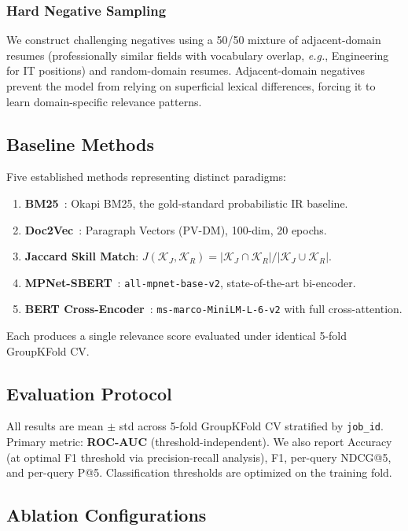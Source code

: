 \documentclass{llncs}
\begin{document}
\subsubsection{Hard Negative Sampling}
We construct challenging negatives using a 50/50 mixture of adjacent-domain resumes (professionally similar fields with vocabulary overlap, \textit{e.g.}, Engineering for IT positions) and random-domain resumes. Adjacent-domain negatives prevent the model from relying on superficial lexical differences, forcing it to learn domain-specific relevance patterns.

\subsection{Baseline Methods}

Five established methods representing distinct paradigms:
\begin{enumerate}
    \item \textbf{BM25}~\cite{robertson2009probabilistic}: Okapi BM25, the gold-standard probabilistic IR baseline.
    \item \textbf{Doc2Vec}~\cite{le2014doc2vec}: Paragraph Vectors (PV-DM), 100-dim, 20 epochs.
    \item \textbf{Jaccard Skill Match}: $J(\mathcal{K}_J, \mathcal{K}_R) = |\mathcal{K}_J \cap \mathcal{K}_R|/|\mathcal{K}_J \cup \mathcal{K}_R|$.
    \item \textbf{MPNet-SBERT}~\cite{song2020mpnet}: \texttt{all-mpnet-base-v2}, state-of-the-art bi-encoder.
    \item \textbf{BERT Cross-Encoder}~\cite{nogueira2019crossencoder}: \texttt{ms-marco-MiniLM-L-6-v2} with full cross-attention.
\end{enumerate}

Each produces a single relevance score evaluated under identical 5-fold GroupKFold CV.

\subsection{Evaluation Protocol}

All results are mean $\pm$ std across 5-fold GroupKFold CV stratified by \texttt{job\_id}. Primary metric: \textbf{ROC-AUC} (threshold-independent). We also report Accuracy (at optimal F1 threshold via precision-recall analysis), F1, per-query NDCG@5, and per-query P@5. Classification thresholds are optimized on the training fold.

\subsection{Ablation Configurations}
\end{document}
